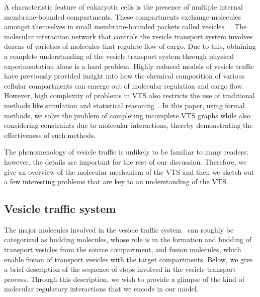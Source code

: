 A characteristic feature of eukaryotic cells is the presence of multiple internal membrane-bounded compartments. 
%
These compartments exchange molecules amongst themselves in small membrane-bounded packets called vesicles ~\cite{alberts2002molecular}. 
%
The molecular interaction network that controls the vesicle transport system involves dozens of varieties of molecules that regulate flow of cargo. 
%
Due to this, obtaining a complete understanding of the vesicle transport system through physical experimentation alone is a hard problem.
%
Highly reduced models of vesicle traffic have previously provided insight into how the chemical composition of various cellular compartments can emerge out of molecular regulation and cargo flow. 
%
However, high complexity of problems in VTS also restricts the use of traditional methods like simulation and statistical reasoning~\cite{mani2016wine, mani2016stacking}. 
In this paper, using formal methods, we solve the problem of completing incomplete VTS graphs while also considering constraints due to molecular interactions, thereby demonstrating the effectiveness of such methods.

The phenomenology of vesicle traffic is unlikely to be familiar to many readers; however, the details are important for the rest of our discussion. 
%
Therefore, we give an overview of the molecular mechanism of the VTS and then we sketch out a few interesting problems that are key to an understanding of the VTS.

\subsection{Vesicle traffic system}

The major molecules involved in the vesicle traffic system~\cite{wells2005discovery} can roughly be categorized as budding molecules, whose role is in the formation and budding of transport vesicles from the source compartment, and fusion molecules, which enable fusion of transport vesicles with the target compartments. 
%
Below, we give a brief description of the sequence of steps involved in the vesicle transport process. 
%
Through this description, we wish to provide a glimpse of the kind of molecular regulatory interactions that we encode in our model.

